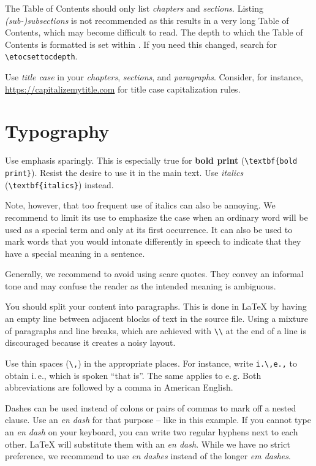 The Table of Contents should only list \emph{chapters} and \emph{sections}. Listing \emph{(sub-)subsections} is not recommended as this results in a very long Table of Contents, which may become difficult to read. The depth to which the Table of Contents is formatted is set within . If you need this changed, search for \texttt{\textbackslash etocsettocdepth}.

Use \emph{title case} in your \emph{chapters}, \emph{sections}, and \emph{paragraphs}. Consider, for instance, \url{https://capitalizemytitle.com} for title case capitalization rules.


\section{Typography}

Use emphasis sparingly. This is especially true for \textbf{bold print} (\verb|\textbf{bold print}|). Resist the desire to use it in the main text. Use \emph{italics} (\verb|\textbf{italics}|) instead.

 Note, however, that too frequent use of italics can also be annoying. We recommend to limit its use to emphasize the case when an ordinary word will be used as a special term and only at its first occurrence. It can also be used to mark words that you would intonate differently in speech to indicate that they have a special meaning in a sentence.

Generally, we recommend to avoid using scare quotes. They convey an informal tone and may confuse the reader as the intended meaning is ambiguous.

You should split your content into paragraphs. This is done in LaTeX by having an empty line between adjacent blocks of text in the source file. Using a mixture of paragraphs and line breaks, which are achieved with \verb|\\| at the end of a line is discouraged because it creates a noisy layout.

Use thin spaces (\verb|\,|) in the appropriate places. For instance, write \verb|i.\,e.,| to obtain i.\,e., which is spoken ``that is''. The same applies to e.\,g. Both abbreviations are followed by a comma in American English.

Dashes can be used instead of colons or pairs of commas to mark off a nested clause. Use an \emph{en dash} for that purpose -- like in this example. If you cannot type an \emph{en dash} on your keyboard, you can write two regular hyphens next to each other. LaTeX will substitute them with an \emph{en dash}. While we have no strict preference, we recommend to use \emph{en dashes} instead of the longer \emph{em dashes}.

